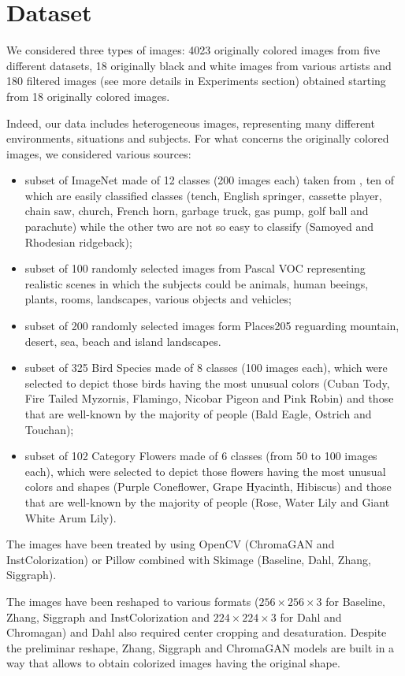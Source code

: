 \section{Dataset}
We considered three types of images: 4023 originally colored images from five different datasets, 18 originally black and white images from various artists and 180 filtered images (see more details in Experiments section) obtained starting from 18 originally colored images.

Indeed, our data includes heterogeneous images, representing many different environments, situations and subjects.
For what concerns the originally colored images, we considered various sources:
\begin{itemize}
	\item subset of ImageNet made of 12 classes (200 images each) taken from \cite{imagenette}, ten of which are easily classified classes (tench, English springer, cassette player, chain saw, church, French horn, garbage truck, gas pump, golf ball and parachute) while the other two are not so easy to classify (Samoyed and Rhodesian ridgeback);
	\item subset of 100 randomly selected images from Pascal VOC \cite{pascal} representing realistic scenes in which the subjects could be animals, human beeings, plants, rooms, landscapes, various objects and vehicles;
	\item subset of 200 randomly selected images form Places205 \cite{place} reguarding mountain, desert, sea, beach and island landscapes.
	\item subset of 325 Bird Species \cite{bird} made of 8 classes (100 images each), which were selected to depict those birds having the most unusual colors (Cuban Tody, Fire Tailed Myzornis, Flamingo, Nicobar Pigeon and Pink Robin) and those that are well-known by the majority of people (Bald Eagle, Ostrich and Touchan);
	\item subset of 102 Category Flowers \cite{flower} made of 6 classes (from 50 to 100 images each), which were selected to depict those flowers having the most unusual colors and shapes (Purple Coneflower, Grape Hyacinth, Hibiscus) and those that are well-known by the majority of people (Rose, Water Lily and Giant White Arum Lily).
\end{itemize}

The images have been treated by using OpenCV (ChromaGAN and InstColorization) or Pillow combined with Skimage (Baseline, Dahl, Zhang, Siggraph).

The images have been reshaped to various formats ($256\times256\times3$ for Baseline, Zhang, Siggraph and InstColorization and $224\times224\times3$ for Dahl and Chromagan) and Dahl also required center cropping and desaturation. Despite the preliminar reshape, Zhang, Siggraph and ChromaGAN models are built in a way that allows to obtain colorized images having the original shape.

